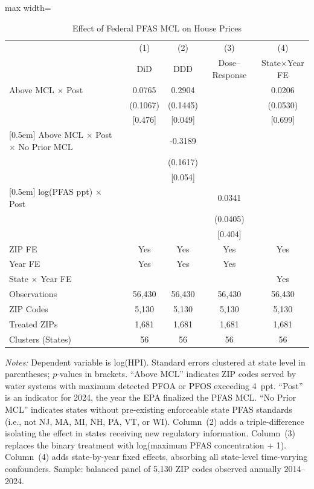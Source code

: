 \begin{table}[htbp]
\centering
\caption{Effect of Federal PFAS MCL on House Prices}
\label{tab:main}
\begin{adjustbox}{max width=\textwidth}
\begin{tabular}{lcccc}
\hline\hline
 & (1) & (2) & (3) & (4) \\
 & DiD & DDD & Dose--Response & State$\times$Year FE \\
\hline
Above MCL $\times$ Post & 0.0765 & 0.2904 & & 0.0206 \\
 & (0.1067) & (0.1445) & & (0.0530) \\
 & [0.476] & [0.049] & & [0.699] \\
{}[0.5em]
Above MCL $\times$ Post $\times$ No Prior MCL & & -0.3189 & & \\
 & & (0.1617) & & \\
 & & [0.054] & & \\
{}[0.5em]
log(PFAS ppt) $\times$ Post & & & 0.0341 & \\
 & & & (0.0405) & \\
 & & & [0.404] & \\
\hline
ZIP FE & Yes & Yes & Yes & Yes \\
Year FE & Yes & Yes & Yes & \\
State $\times$ Year FE & & & & Yes \\
Observations & 56,430 & 56,430 & 56,430 & 56,430 \\
ZIP Codes & 5,130 & 5,130 & 5,130 & 5,130 \\
Treated ZIPs & 1,681 & 1,681 & 1,681 & 1,681 \\
Clusters (States) & 56 & 56 & 56 & 56 \\
\hline\hline
\end{tabular}
\end{adjustbox}
\par\vspace{0.3em}\begin{minipage}{\textwidth}{\footnotesize \textit{Notes:} Dependent variable is log(HPI). Standard errors clustered at state level in parentheses; $p$-values in brackets. ``Above MCL'' indicates ZIP codes served by water systems with maximum detected PFOA or PFOS exceeding 4~ppt. ``Post'' is an indicator for 2024, the year the EPA finalized the PFAS MCL. ``No Prior MCL'' indicates states without pre-existing enforceable state PFAS standards (i.e., not NJ, MA, MI, NH, PA, VT, or WI). Column~(2) adds a triple-difference isolating the effect in states receiving new regulatory information. Column~(3) replaces the binary treatment with log(maximum PFAS concentration + 1). Column~(4) adds state-by-year fixed effects, absorbing all state-level time-varying confounders. Sample: balanced panel of 5,130 ZIP codes observed annually 2014--2024.}\end{minipage}
\end{table}

